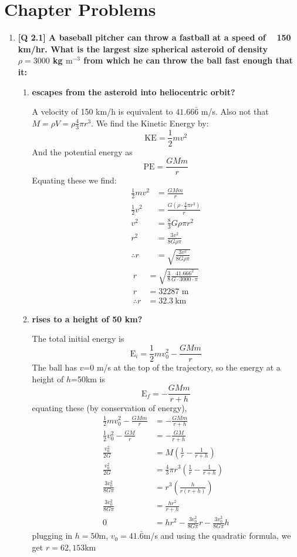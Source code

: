 \documentclass[10pt]{article}
\begin{document}
	\section{Chapter Problems}
	\begin{enumerate}
		\item  \textbf{[Q 2.1] A baseball pitcher can throw a fastball at a speed of ~ 150 km/hr. What is the largest size spherical asteroid of density $\rho = 3000$ kg $\text{m}^{-3}$ from which he can throw the ball fast enough that it:} 
		\begin{enumerate}
			\item  \textbf{escapes from the asteroid into heliocentric orbit?}
			
			A velocity of 150 km/h is equivalent to $41.66\bar{6}$ m/s. Also not that $M = \rho V = \rho \frac{4}{3} \pi r^3$. We find the Kinetic Energy by:
			\[ \text{KE} = \frac{1}{2} mv^2 \]
			And the potential energy as 
			\[ \text{PE} = \frac{GMm}{r} \]
			Equating these we find:
			\begin{align*}
				\frac{1}{2} mv^2 &= \frac{GMm}{r} \\
				\frac{1}{2} v^2 &= \frac{G \left( \rho \cdot \frac{4}{3} \pi r^3 \right)}{r} \\
				v^2 &=  \frac{8}{3} G \rho \pi r^2 \\
				r^2 &= \frac{3 v^2}{8 G \rho \pi} \\
				\therefore r &= \sqrt{\frac{3 v^2}{8 G \rho \pi}} 
			\end{align*}
			\begin{align*}
				r &= \sqrt{\frac{3}{8}\frac{41.666^2}{G \cdot 3000 \cdot \pi}} \\
				r &= 32 287 \text{ m} \\
				\therefore r &= 32.3 \ \text{km}
			\end{align*}
			\item  \textbf{rises to a height of 50 km?}

			The total initial energy is
			\[ \text{E}_i = \frac{1}{2}mv_0^2 - \frac{GMm}{r} \]
			The ball has $v$=0 m/s at the top of the trajectory, so the energy at a height of $h$=50km is
			\[ \text{E}_f = -\frac{GMm}{r + h} \]
			equating these (by conservation of energy),
			\begin{align*}
			    \frac{1}{2}mv_0^2 - \frac{GMm}{r} &= -\frac{GMm}{r+h}  \\
			    \frac{1}{2}v_0^2 - \frac{GM}{r} &= -\frac{GM}{r+h} \\
			    \frac{v_0^2}{2G} &= M\left(\frac{1}{r} - \frac{1}{r+h}\right) \\
			    \frac{v_0^2}{2G} &= \frac{4}{3}\pi r^3 \left(\frac{1}{r} - \frac{1}{r+h}\right)\\
			    \frac{3v_0^2}{8G\pi} &= r^3 \left(\frac{h}{r(r+h)}\right) \\
			    \frac{3v_0^2}{8G\pi} &= \frac{hr^2}{r+h} \\
			    0 &= hr^2 - \frac{3v_0^2}{8G\pi} r - \frac{3v_0^2}{8G\pi}h
			\end{align*}
			plugging in $h=50$m, $v_0 = 41.\bar{6}$m/s and using the quadratic formula, we get $r = 62,153$km
			

\end{enumerate}
\end{enumerate}
\end{document}
